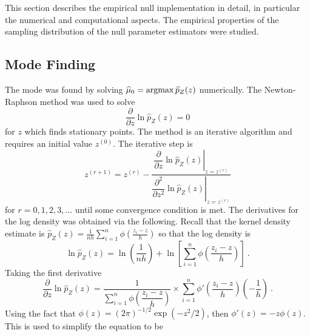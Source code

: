 This section describes the empirical null implementation in detail, in particular the numerical and computational aspects. The empirical properties of the sampling distribution of the null parameter estimators were studied.

\subsection{Mode Finding}

The mode was found by solving $\widehat{\mu}_0 = \operatorname*{argmax}\widehat{p}_Z(z)$ numerically. The Newton-Raphson method was used to solve
\begin{equation}
  \dfrac{
    \partial
  }
  {
    \partial z
  }
  \ln\widehat{p}_Z(z)
  = 0
\end{equation}
for $z$ which finds stationary points. The method is an iterative algorithm and requires an initial value $z^{(0)}$. The iterative step is
\begin{equation}
  z^{(r+1)} =
  z^{(r)}
  -\dfrac{
    \left.
      \dfrac{
        \partial
      }
      {
        \partial z
      }
      \ln\widehat{p}_Z(z)
    \right|_{z = z^{(r)}}
  }
  {
    \left.
      \dfrac{
        \partial^2
      }
      {
        \partial z^2
      }
      \ln\widehat{p}_Z(z)
    \right|_{z = z^{(r)}}
  } 
\end{equation}
for $r=0,1,2,3,\dotsc$ until some convergence condition is met. The derivatives for the log density was obtained via the following. Recall that the kernel density estimate is $\widehat{p}_Z(z)=
  \frac{1}{nh}
  \sum_{i=1}^n\phi\left(
    \frac{z_i-z}{h}
  \right) $
so that the log density is
\begin{equation}
  \ln\widehat{p}_Z(z)=
  \ln\left(
    \dfrac{1}{nh}
  \right)
  +
  \ln\left[
    \sum_{i=1}^n
    \phi\left(
      \dfrac{
        z_i - z
      }
      {
        h
      }
    \right)
  \right]
  \ .
\end{equation}
Taking the first derivative
\begin{equation*}
  \dfrac{
    \partial
  }
  {
    \partial z
  }
  \ln\widehat{p}_Z(z)
  =
  \dfrac{
    1
  }
  {
    \sum_{i=1}^n
    \phi\left(
      \dfrac{
        z_i - z
      }
      {
        h
      }
    \right)
  }
  \times
  \sum_{i=1}^n
  \phi'\left(
    \dfrac{
      z_i - z
    }
    {
      h
    }
  \right)
  \left(
    -\dfrac{
      1
    }
    {
      h
    }
  \right)
  \ .
\end{equation*}
Using the fact that $\phi(z)=(2\pi)^{-1/2}\exp(-z^2/2)$, then $\phi'(z)=-z\phi(z)$. This is used to simplify the equation to be
